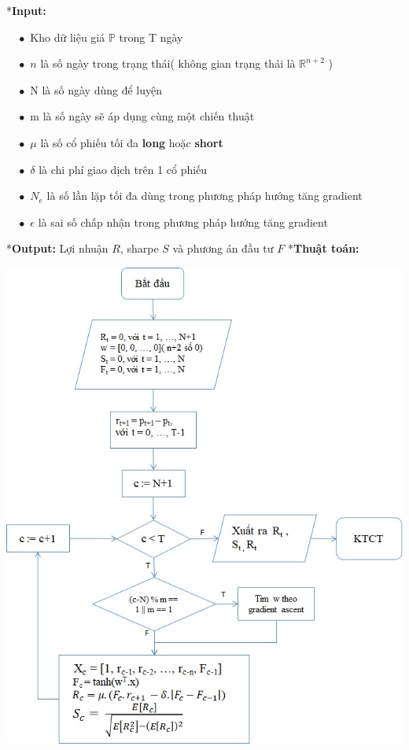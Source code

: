 \documentclass[14pt]{extreport}
\begin{document}
*\textbf{Input: }

$\quad \bullet$ Kho dữ liệu giá $\mathbb{P}$ trong T ngày

$\quad \bullet $ $n$ là số ngày trong trạng thái( không gian trạng thái là $\mathbb{R}^{n+2}$ )

$\quad \bullet $ N là số ngày dùng để luyện

$\quad \bullet $ m là số ngày sẽ áp dụng cùng một chiến thuật

$\quad \bullet $ {\large $\mu$} là số cổ phiếu tối đa \textbf{long} hoặc \textbf{short} 

$\quad \bullet $ {\large $\delta$} là chi phí giao dịch trên 1 cổ phiếu 

$\quad \bullet $ $N_e$ là số lần lặp tối đa dùng trong phương pháp hướng tăng gradient

$\quad \bullet $ {\large $\epsilon$} là sai số chấp nhận trong phương pháp hướng tăng gradient

*\textbf{Output: } Lợi nhuận $\mathit{R}$, sharpe $\mathit{S}$ và phương án đầu tư $\mathit{F}$ 
\newpage
*\textbf{Thuật toán: }

\begin{center}
\includegraphics[scale=0.9]{Thuat_toan.jpg}
\end{center}
\end{document}

